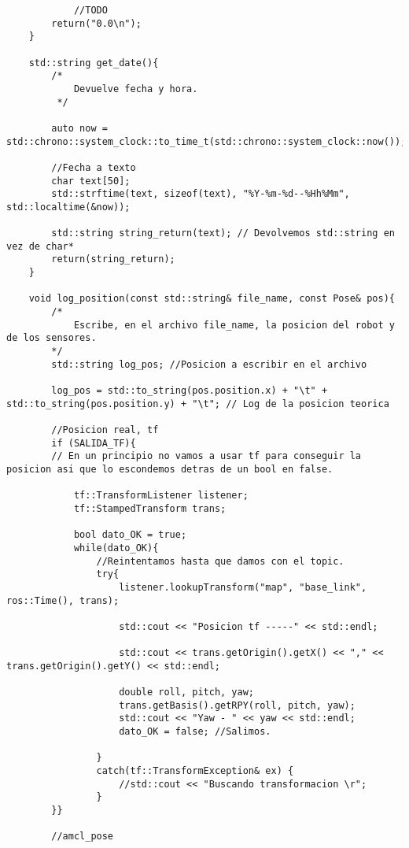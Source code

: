 \begin{lstlisting}
            //TODO
        return("0.0\n");
    }
    
    std::string get_date(){
        /*
            Devuelve fecha y hora.
         */
    
        auto now = std::chrono::system_clock::to_time_t(std::chrono::system_clock::now());
    
        //Fecha a texto
        char text[50];
        std::strftime(text, sizeof(text), "%Y-%m-%d--%Hh%Mm", std::localtime(&now));
    
        std::string string_return(text); // Devolvemos std::string en vez de char*
        return(string_return);
    }
    
    void log_position(const std::string& file_name, const Pose& pos){
        /* 
            Escribe, en el archivo file_name, la posicion del robot y de los sensores.    
        */
        std::string log_pos; //Posicion a escribir en el archivo
    
        log_pos = std::to_string(pos.position.x) + "\t" + std::to_string(pos.position.y) + "\t"; // Log de la posicion teorica
    
        //Posicion real, tf
        if (SALIDA_TF){
        // En un principio no vamos a usar tf para conseguir la posicion asi que lo escondemos detras de un bool en false.
    
            tf::TransformListener listener;
            tf::StampedTransform trans;  
            
            bool dato_OK = true;
            while(dato_OK){
                //Reintentamos hasta que damos con el topic.
                try{
                    listener.lookupTransform("map", "base_link", ros::Time(), trans);
        
                    std::cout << "Posicion tf -----" << std::endl;
        
                    std::cout << trans.getOrigin().getX() << "," << trans.getOrigin().getY() << std::endl;
                    
                    double roll, pitch, yaw;
                    trans.getBasis().getRPY(roll, pitch, yaw);
                    std::cout << "Yaw - " << yaw << std::endl;
                    dato_OK = false; //Salimos.
                
                }
                catch(tf::TransformException& ex) {
                    //std::cout << "Buscando transformacion \r";
                }
        }}
    
        //amcl_pose
    

\end{lstlisting}
